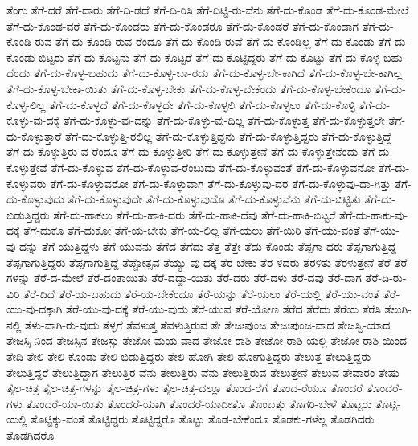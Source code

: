 {ತೆಂಗು
ತೆಗೆ-ದರೆ
ತೆಗೆ-ದಾರು
ತೆಗೆ-ದಿ-ಡದೆ
ತೆಗೆ-ದಿ-ರಿಸಿ
ತೆಗೆ-ದಿಟ್ಟಿ-ರು-ವೆನು
ತೆಗೆ-ದು-ಕೊಂಡ
ತೆಗೆ-ದು-ಕೊಂಡ-ಮೇಲೆ
ತೆಗೆ-ದು-ಕೊಂಡ-ವರೆ
ತೆಗೆ-ದು-ಕೊಂಡರು
ತೆಗೆ-ದು-ಕೊಂಡರೂ
ತೆಗೆ-ದು-ಕೊಂಡರೆ
ತೆಗೆ-ದು-ಕೊಂಡಾಗ
ತೆಗೆ-ದು-ಕೊಂಡಿ-ರುವ
ತೆಗೆ-ದು-ಕೊಂಡಿ-ರುವ-ರೆಂದೂ
ತೆಗೆ-ದು-ಕೊಂಡಿ-ರುವೆ
ತೆಗೆ-ದು-ಕೊಂಡಿಲ್ಲ
ತೆಗೆ-ದು-ಕೊಂಡು
ತೆಗೆ-ದು-ಕೊಂಡು-ಬಿಟ್ಟರು
ತೆಗೆ-ದು-ಕೊಟ್ಟನು
ತೆಗೆ-ದು-ಕೊಟ್ಟರೆ
ತೆಗೆ-ದು-ಕೊಟ್ಟಿದ್ದರು
ತೆಗೆ-ದು-ಕೊಟ್ಟು
ತೆಗೆ-ದು-ಕೊಳ್ಳ-ಬಹು-ದೆಂದು
ತೆಗೆ-ದು-ಕೊಳ್ಳ-ಬಹುದು
ತೆಗೆ-ದು-ಕೊಳ್ಳ-ಬಾ-ರದು
ತೆಗೆ-ದು-ಕೊಳ್ಳ-ಬೇ-ಕಾಗಿದೆ
ತೆಗೆ-ದು-ಕೊಳ್ಳ-ಬೇ-ಕಾಗಿಲ್ಲ
ತೆಗೆ-ದು-ಕೊಳ್ಳ-ಬೇಕಾ-ಯಿತು
ತೆಗೆ-ದು-ಕೊಳ್ಳ-ಬೇಕು
ತೆಗೆ-ದು-ಕೊಳ್ಳ-ಬೇಕೆಂದು
ತೆಗೆ-ದು-ಕೊಳ್ಳ-ಬೇಕೆಂದೂ
ತೆಗೆ-ದು-ಕೊಳ್ಳ-ಲಿಲ್ಲ
ತೆಗೆ-ದು-ಕೊಳ್ಳದೆ
ತೆಗೆ-ದು-ಕೊಳ್ಳದೇ
ತೆಗೆ-ದು-ಕೊಳ್ಳಲಿ
ತೆಗೆ-ದು-ಕೊಳ್ಳಲು
ತೆಗೆ-ದು-ಕೊಳ್ಳಿ
ತೆಗೆ-ದು-ಕೊಳ್ಳು-ವು-ದಕ್ಕೆ
ತೆಗೆ-ದು-ಕೊಳ್ಳು-ವು-ದನ್ನು
ತೆಗೆ-ದು-ಕೊಳ್ಳು-ವು-ದಿಲ್ಲ
ತೆಗೆ-ದು-ಕೊಳ್ಳುತ್ತ
ತೆಗೆ-ದು-ಕೊಳ್ಳುತ್ತಲೇ
ತೆಗೆ-ದು-ಕೊಳ್ಳುತ್ತಾರೆ
ತೆಗೆ-ದು-ಕೊಳ್ಳುತ್ತಿ-ರಲಿಲ್ಲ
ತೆಗೆ-ದು-ಕೊಳ್ಳುತ್ತಿದ್ದನು
ತೆಗೆ-ದು-ಕೊಳ್ಳುತ್ತಿದ್ದರು
ತೆಗೆ-ದು-ಕೊಳ್ಳುತ್ತಿದ್ದೆ
ತೆಗೆ-ದು-ಕೊಳ್ಳುತ್ತಿರು-ವ-ರೆಂದೂ
ತೆಗೆ-ದು-ಕೊಳ್ಳುತ್ತೀರಿ
ತೆಗೆ-ದು-ಕೊಳ್ಳುತ್ತೇನೆ
ತೆಗೆ-ದು-ಕೊಳ್ಳುತ್ತೇನೆಂದು
ತೆಗೆ-ದು-ಕೊಳ್ಳುತ್ತೇವೆ
ತೆಗೆ-ದು-ಕೊಳ್ಳುವ
ತೆಗೆ-ದು-ಕೊಳ್ಳುವ-ರೆಂಬುದು
ತೆಗೆ-ದು-ಕೊಳ್ಳುವಂತೆ
ತೆಗೆ-ದು-ಕೊಳ್ಳುವನೋ
ತೆಗೆ-ದು-ಕೊಳ್ಳುವರು
ತೆಗೆ-ದು-ಕೊಳ್ಳುವರೋ
ತೆಗೆ-ದು-ಕೊಳ್ಳುವಾಗ
ತೆಗೆ-ದು-ಕೊಳ್ಳುವು-ದರ
ತೆಗೆ-ದು-ಕೊಳ್ಳುವು-ದಾ-ಗಿತ್ತು
ತೆಗೆ-ದು-ಕೊಳ್ಳುವುದು
ತೆಗೆ-ದು-ಕೊಳ್ಳುವುದೇ
ತೆಗೆ-ದು-ಕೊಳ್ಳುವುದೊ
ತೆಗೆ-ದು-ಕೊಳ್ಳುವೆನು
ತೆಗೆ-ದು-ಬಿಟ್ಟಿತು
ತೆಗೆ-ದು-ಬಿಡುತ್ತಿದ್ದರು
ತೆಗೆ-ದು-ಹಾಕಲು
ತೆಗೆ-ದು-ಹಾಕಿ-ದರು
ತೆಗೆ-ದು-ಹಾಕಿ-ದೆವು
ತೆಗೆ-ದು-ಹಾಕಿ-ಬಿಟ್ಟರೆ
ತೆಗೆ-ದು-ಹಾಕು-ವು-ದಕ್ಕೆ
ತೆಗೆ-ದುಕೊ
ತೆಗೆ-ದುಕೋ
ತೆಗೆ-ಯ-ಬೇಕು
ತೆಗೆ-ಯ-ಲಿಲ್ಲ
ತೆಗೆ-ಯಲು
ತೆಗೆ-ಯಿರಿ
ತೆಗೆ-ಯು-ವಂತೆ
ತೆಗೆ-ಯು-ವು-ದನ್ನು
ತೆಗೆ-ಯುತ್ತಿದ್ದಳು
ತೆಗೆ-ಯುವನು
ತೆಗೆದ
ತೆಗೆದು
ತೆತ್ತ
ತೆತ್ತೇ
ತೆದು-ಕೊಂಡು
ತೆಪ್ಪಗಾ-ದರು
ತೆಪ್ಪಗಾಗುತ್ತಿದ್ದ
ತೆಪ್ಪಗಾಗುತ್ತಿದ್ದರು
ತೆಪ್ಪಗಾಗುತ್ತಿದ್ದೆ
ತೆಪ್ಪೋತ್ಸವ
ತೆಯ್ಯು-ವು-ದಕ್ಕೆ
ತೆರ-ಬೇಕು
ತೆರ-ಳಿದರು
ತೆರಳಿತು
ತೆರಳುತ್ತೇನೆ
ತೆರೆ
ತೆರೆ-ಗಳನ್ನು
ತೆರೆ-ದ-ಮೇಲೆ
ತೆರೆ-ದಂತಾಯಿತು
ತೆರೆ-ದದ್ದಾ-ಯಿತು
ತೆರೆ-ದರು
ತೆರೆ-ದಳು
ತೆರೆ-ದವು
ತೆರೆ-ದಾಗ
ತೆರೆ-ದಿ-ರು-ವಿರಿ
ತೆರೆ-ದಿದೆ
ತೆರೆ-ಯ-ಬಹುದು
ತೆರೆ-ಯ-ಬೇಕೆಂದೂ
ತೆರೆ-ಯನ್ನು
ತೆರೆ-ಯಲು
ತೆರೆ-ಯಲ್ಲಿ
ತೆರೆ-ಯು-ವಂತೆ
ತೆರೆ-ಯು-ವು-ದಕ್ಕಾಗಿ
ತೆರೆ-ಯು-ವು-ದಕ್ಕೆ
ತೆರೆ-ಯು-ವುದು
ತೆರೆ-ಯುವ
ತೆರೆ-ಯೋಣ
ತೆರೆದ
ತೆರೆದು
ತೆರೆಯ
ತೆರೆಸಿ
ತೆಲುಗಿ-ನಲ್ಲಿ
ತೆಳು-ವಾಗಿ-ರು-ವುದು
ತೆಳ್ಳಗೆ
ತೆವಳುತ್ತ
ತೆವಳುತ್ತಿರುವ
ತೇ
ತೇಜಃಪುಂಜ
ತೇಜಃಪುಂಜ-ವಾದ
ತೇಜಸ್ವಿ-ಯಾದ
ತೇಜಸ್ಸಿ-ನಿಂದ
ತೇಜಸ್ಸಿನ
ತೇಜಸ್ಸು
ತೇಜೋ-ಮಯ-ವಾದ
ತೇಜೋ-ರಾಶಿ
ತೇಜೋ-ರಾಶಿ-ಯಲ್ಲಿ
ತೇಜೋ-ರಾಶಿ-ಯಿಂದ
ತೇದಿ
ತೇಲಿ
ತೇಲಿ-ಕೊಂಡು
ತೇಲಿ-ಬಿಡುತ್ತಿದ್ದರು
ತೇಲಿ-ಹೋಗಿ
ತೇಲಿ-ಹೋಗುತ್ತಿದ್ದರು
ತೇಲುತ್ತ
ತೇಲುತ್ತಿದ್ದರು
ತೇಲುತ್ತಿದ್ದರೆ
ತೇಲುತ್ತಿದ್ದಾಗ
ತೇಲುತ್ತಿರ-ವೆನು
ತೇಲುತ್ತಿರು-ವೆನು
ತೇಲುತ್ತಿರುವ
ತೇಲುತ್ತೇನೆ
ತೇಲುವ
ತೇವಾರಂ
ತೇಷು
ತೈಲ-ಚಿತ್ರ
ತೈಲ-ಚಿತ್ರ-ಗಳನ್ನು
ತೈಲ-ಚಿತ್ರ-ಗಳು
ತೈಲ-ಚಿತ್ರ-ದಲ್ಲೂ
ತೊಂದ-ರೆಗೆ
ತೊಂದ-ರೆಯೂ
ತೊಂದರೆ
ತೊಂದರೆ-ಗಳು
ತೊಂದರೆ-ಯಾ-ಯಿತು
ತೊಂದರೆ-ಯಾಗಿ
ತೊಂದರೆ-ಯಾದೀತೊ
ತೊಂಬತ್ತು
ತೊಗರಿ-ಬೇಳೆ
ತೊಟ್ಟರು
ತೊಟ್ಟಿ-ಯಲ್ಲಿ
ತೊಟ್ಟಿಕ್ಕು-ವಂತೆ
ತೊಟ್ಟಿದ್ದರು
ತೊಟ್ಟಿದ್ದರೊ
ತೊಟ್ಟು
ತೊಡ-ಬೇಕೆಂದೂ
ತೊಡಕು-ಗಳೆಲ್ಲ
ತೊಡಗಿದರು
ತೊಡಗಿದರೊ
}
